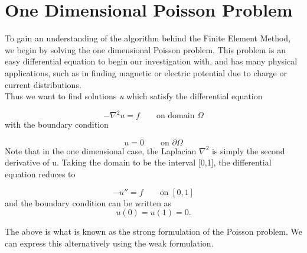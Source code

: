 \documentclass{article}
\begin{document}
\section{One Dimensional Poisson Problem}
To gain an understanding of the algorithm behind the Finite Element Method, we begin by solving the one dimensional Poisson problem. This problem is an easy differential equation to begin our investigation with, and has many physical applications, such as in finding magnetic or electric potential due to charge or current distributions. \\
Thus we want to find solutions \textit{u} which satisfy the differential equation

\[-\nabla^{2}u = f  \qquad\textrm{on domain }\Omega \]
with the boundary condition 

\[u = 0 \qquad\textrm{on } \partial\Omega\]
Note that in the one dimensional case, the Laplacian $\nabla^{2}$ is simply the second derivative of u. Taking the domain to be the interval [0,1], the differential equation reduces to 

$$ -u'' = f \qquad\textrm{on }[0,1] $$
and the boundary condition can be written as
$$ u(0) = u(1) = 0. $$

The above is what is known as the strong formulation of the Poisson problem. We can express this alternatively using the weak formulation.
\end{document}
